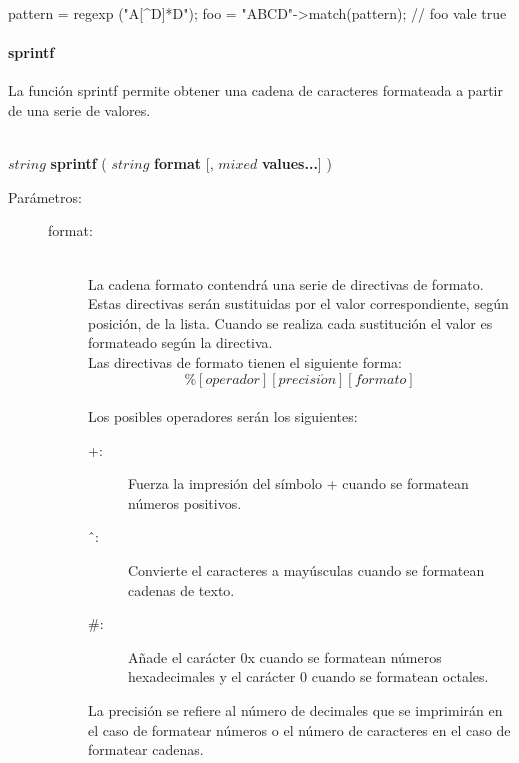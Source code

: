 \begin{myverbatim}   
   pattern = regexp ("A[^D]*D"); 
   foo = "ABCD"->match(pattern); // foo vale true
\end{myverbatim}

\paragraph{sprintf}
La función sprintf permite obtener una cadena de caracteres formateada a partir de una serie de valores. 

\begin{framed}
\hfill \\ $string$ \textbf{sprintf} ( $string$ \textbf{format} [, $mixed$ \textbf{values...}] )  
\begin{description}
\item [Parámetros:] \hfill 
   \begin{description}
   \item[format:]  \hfill \\
      La cadena formato contendrá una serie de
		directivas de formato. Estas directivas serán sustituidas por el valor correspondiente, según posición, de la
		lista. Cuando se realiza cada sustitución el valor es formateado según la directiva. \\
		
		Las directivas de formato tienen el siguiente forma:
		$$\%[operador][precisi\acute{o}n][formato]$$ \\
		Los posibles operadores serán los siguientes:
		\begin{description}
			\item[ +:] Fuerza la impresión del símbolo + cuando se formatean números positivos.
			\item[ \^\ :] Convierte el caracteres a mayúsculas cuando se formatean cadenas de texto.
			\item[ \#:] Añade el carácter 0x cuando se formatean números hexadecimales y el carácter 0 cuando se formatean octales.
		\end{description} \hfill 
	
		La precisión se refiere al número de decimales que se imprimirán en el caso de formatear
		números o el número de caracteres en el caso de formatear cadenas. \\		


\end{description}
\end{description}
\end{framed}
